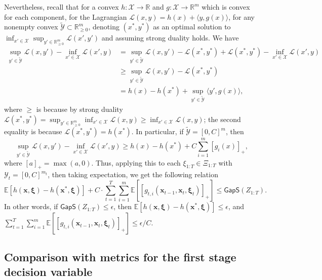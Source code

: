 \documentclass[11pt,fullpage,letterpaper]{article}
\newcommand{\mc}{\mathcal}
\newcommand{\mb}{\mathbf}
\newcommand{\R}{\mathbb{R}}
\newcommand{\E}{\mathbb{E}}
\newcommand{\bx}{\boldsymbol{\xi}}
\newcommand{\gaps}{\mathsf{GapS}}
\begin{document}
Nevertheless, recall that for a convex $h:\mc X\to \R$ and $g:\mc X\to \R^{m}$ which is convex for each component, for the Lagrangian $\mc L(x,y) = h(x) + \langle y,g(x)\rangle$, for any nonempty convex $\widetilde{\mc Y}\subset \R^m_{\geq 0}$, denoting $(x^*,y^*)$ as an optimal solution to $\inf_{x'\in \mc X} \sup_{y'\in \R^m_{\geq 0}}\mc L(x',y')$ and assuming strong duality holds. We have 
\begin{align*}
    \sup_{y'\in \widetilde{\mc Y}}\mc L(x,y')-\inf_{x'\in \mc X}\mc L(x',y)&= \sup_{y'\in \widetilde{\mc Y}}\mc L(x,y')-\mc L(x^*,y^*) + \mc L(x^*,y^*)-\inf_{x'\in \mc X}\mc L(x',y)\\
    &\geq  \sup_{y'\in \widetilde{\mc Y}}\mc L(x,y')-\mc L(x^*,y^*)\\
    &=h(x)-h(x^*) + \sup_{y'\in \widetilde{\mc Y}}\langle y',g(x)\rangle, 
\end{align*}
where $\geq$ is because by strong duality $\mc L(x^*,y^*) =  \sup_{y'\in \R^m_{\geq 0}}\inf_{x'\in \mc X}\mc L(x,y)\geq \inf_{x'\in \mc X}\mc L(x,y)$; the second equality is because $\mc L(x^*,y^*) = h(x^*)$. In particular, if $\widetilde{\mc Y} = [0,C]^m$, then 
\begin{equation*}
    \sup_{y'\in \widetilde{\mc Y}}\mc L(x,y')-\inf_{x'\in \mc X}\mc L(x',y)\geq h(x) - h(x^*) + C\sum_{i=1}^m [g_i(x)]_+,
\end{equation*}
where $[a]_+ = \max(a,0)$. Thus, applying this to each $\xi_{1:T}\in \Xi_{1:T}$ with $\mc Y_t = [0,C]^{m_t}$, then taking expectation, we get the following relation
\begin{equation*}
    \E[h(\mb x,\bx) - h(\mb x^*,\bx)] + C\cdot \sum_{t=1}^T\sum_{i=1}^m \E[[g_{t,i}(\mb x_{t-1},\mb x_t,\bx_t)]_+]\leq \gaps(Z_{1:T}).
\end{equation*}
In other words, if $\gaps(Z_{1:T})\leq \epsilon$, then $ \E[h(\mb x,\bx) - h(\mb x^*,\bx)]\leq \epsilon$, and $\sum_{t=1}^T\sum_{i=1}^m \E[[g_{t,i}(\mb x_{t-1},\mb x_t,\bx_t)]_+]\leq \epsilon/C$. 

\subsection{Comparison with metrics for the first stage decision variable}\label{sec:compare-stage-one} 
\end{document}
